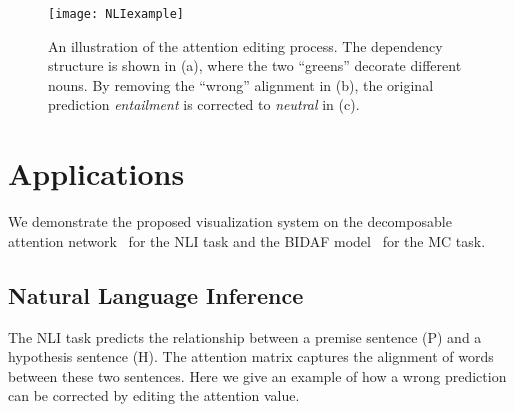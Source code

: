 \begin{figure*}[t]
\centering
\vspace{-2mm}
 \texttt{[image: NLIexample]}
  \vspace{-7mm}
 \caption{
An illustration of the attention editing process.
The dependency structure is shown in (a), where the two ``greens'' decorate different nouns.
By removing the ``wrong'' alignment in (b), the original prediction \emph{entailment} is corrected to \emph{neutral} in (c).
}
\vspace{-2mm}
\label{fig:NLIexample}
\end{figure*}

\section{Applications}
We demonstrate the proposed visualization system on the decomposable attention network~\cite{parikh2016emnlp}
for the NLI task and the BIDAF model~\cite{Seo2016} for the MC task.

\subsection{Natural Language Inference}
\label{sec:NLIexample}
The NLI task predicts the relationship between a premise sentence (P) and a hypothesis sentence (H).
The attention matrix captures the alignment of words between these two sentences.
Here we give an example of how a wrong prediction can be corrected by editing the attention value.  


